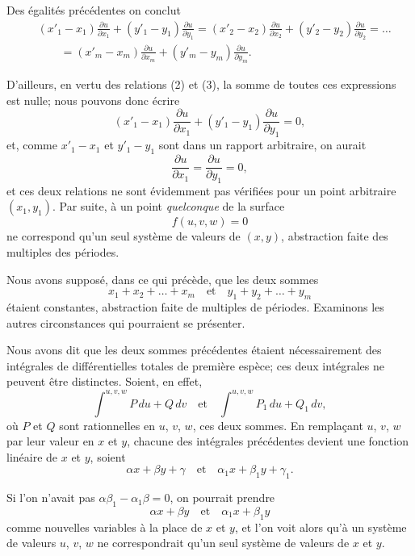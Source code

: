 \documentclass{article}
\begin{document}
Des égalités précédentes on conclut
\[
\begin{aligned}
&(x'_{1} - x_{1})\frac{\partial u}{\partial x_{1}} + (y'_{1} - y_{1})\frac{\partial u}{\partial y_{1}} = (x'_{2} - x_{2})\frac{\partial u}{\partial x_{2}} + (y'_{2} - y_{2})\frac{\partial u}{\partial y_{2}} = \ldots \\
&\qquad = (x'_{m} - x_{m})\frac{\partial u}{\partial x_{m}} + (y'_{m} - y_{m})\frac{\partial u}{\partial y_{m}}.
\end{aligned}
\]

D'ailleurs, en vertu des relations (2) et (3), la somme de toutes ces expressions est nulle; nous pouvons donc écrire
\[
(x'_{1} - x_{1})\frac{\partial u}{\partial x_{1}} + (y'_{1} - y_{1})\frac{\partial u}{\partial y_{1}} = 0,
\]
et, comme $x'_{1} - x_{1}$ et $y'_{1} - y_{1}$ sont dans un rapport arbitraire, on aurait
\[
\frac{\partial u}{\partial x_{1}} = \frac{\partial u}{\partial y_{1}} = 0,
\]
et ces deux relations ne sont évidemment pas vérifiées pour un point arbitraire $(x_{1}, y_{1})$. Par suite, à un point \emph{quelconque} de la surface
\[
f(u, v, w) = 0
\]
ne correspond qu'un seul système de valeurs de $(x, y)$, abstraction faite des multiples des périodes.

Nous avons supposé, dans ce qui précède, que les deux sommes
\[
x_{1} + x_{2} + \ldots + x_{m} \quad \text{et} \quad y_{1} + y_{2} + \ldots + y_{m}
\]
étaient constantes, abstraction faite de multiples de périodes. Examinons les autres circonstances qui pourraient se présenter.

Nous avons dit que les deux sommes précédentes étaient nécessairement des intégrales de différentielles totales de première espèce; ces deux intégrales ne peuvent être distinctes. Soient, en effet,
\[
\int^{u, v, w} P\,du + Q\,dv \quad \text{et} \quad \int^{u, v, w} P_{1}\,du + Q_{1}\,dv,
\]
où $P$ et $Q$ sont rationnelles en $u$, $v$, $w$, ces deux sommes. En remplaçant $u$, $v$, $w$ par leur valeur en $x$ et $y$, chacune des intégrales précédentes devient une fonction linéaire de $x$ et $y$, soient
\[
\alpha x + \beta y + \gamma \quad \text{et} \quad \alpha_{1}x + \beta_{1}y + \gamma_{1}.
\]

Si l'on n'avait pas $\alpha\beta_{1} - \alpha_{1}\beta = 0$, on pourrait prendre
\[
\alpha x + \beta y \quad \text{et} \quad \alpha_{1}x + \beta_{1}y
\]
comme nouvelles variables à la place de $x$ et $y$, et l'on voit alors qu'à un système de valeurs $u$, $v$, $w$ ne correspondrait qu'un seul système de valeurs de $x$ et $y$.
\end{document}
